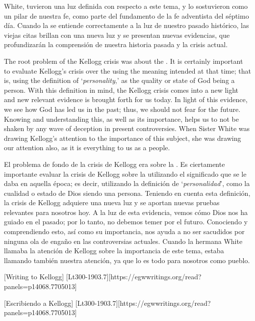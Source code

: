 White, tuvieron una luz definida con respecto a este tema, y lo sostuvieron como un pilar de nuestra fe, como parte del fundamento de la fe adventista del séptimo día. Cuando la  se entiende correctamente a la luz de nuestro pasado histórico, las viejas citas brillan con una nueva luz y se presentan nuevas evidencias, que profundizarán la comprensión de nuestra historia pasada y la crisis actual.


The root problem of the Kellogg crisis was about the . It is certainly important to evaluate Kellogg's crisis over the  using the meaning intended at that time; that is, using the definition of ‘\textit{personality},’ as the quality or state of God being a person. With this definition in mind, the Kellogg crisis comes into a new light and new relevant evidence is brought forth for us today. In light of this evidence, we see how God has led us in the past; thus, we should not fear for the future. Knowing and understanding this, as well as its importance, helps us to not be shaken by any wave of deception in present controversies. When Sister White was drawing Kellogg’s attention to the importance of this subject, she was drawing our attention also, as it is everything to us as a people.


El problema de fondo de la crisis de Kellogg era sobre la . Es ciertamente importante evaluar la crisis de Kellogg sobre la  utilizando el significado que se le daba en aquella época; es decir, utilizando la definición de ‘\textit{personalidad}’, como la cualidad o estado de Dios siendo una persona. Teniendo en cuenta esta definición, la crisis de Kellogg adquiere una nueva luz y se aportan nuevas pruebas relevantes para nosotros hoy. A la luz de esta evidencia, vemos cómo Dios nos ha guiado en el pasado; por lo tanto, no debemos temer por el futuro. Conociendo y comprendiendo esto, así como su importancia, nos ayuda a no ser sacudidos por ninguna ola de engaño en las controversias actuales. Cuando la hermana White llamaba la atención de Kellogg sobre la importancia de este tema, estaba llamando también nuestra atención, ya que lo es todo para nosotros como pueblo.


[Writing to Kellogg] [Lt300-1903.7][https://egwwritings.org/read?panels=p14068.7705013]


[Escribiendo a Kellogg] [Lt300-1903.7][https://egwwritings.org/read?panels=p14068.7705013]


